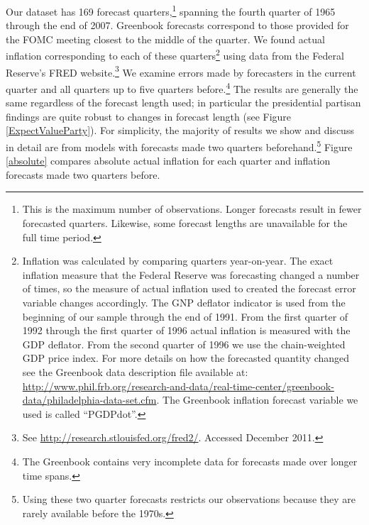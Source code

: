 \documentclass[a4paper]{article}\usepackage{graphicx, color}
\begin{document}
Our dataset has 169 forecast quarters,\footnote{This is the maximum number of observations. Longer forecasts result in fewer forecasted quarters. Likewise, some forecast lengths are unavailable for the full time period.} spanning the fourth quarter of 1965 through the end of 2007. Greenbook forecasts correspond to those provided for the FOMC meeting closest to the middle of the quarter. We found actual inflation corresponding to each of these quarters\footnote{Inflation was calculated by comparing quarters year-on-year. The exact inflation measure that the Federal Reserve was forecasting changed a number of times, so the measure of actual inflation used to created the forecast error variable changes accordingly. The GNP deflator indicator is used from the beginning of our sample through the end of 1991. From the first quarter of 1992 through the first quarter of 1996 actual inflation is measured with the GDP deflator. From the second quarter of 1996 we use the chain-weighted GDP price index. For more details on how the forecasted quantity changed see the Greenbook data description file available at: \url{http://www.phil.frb.org/research-and-data/real-time-center/greenbook-data/philadelphia-data-set.cfm}. The Greenbook inflation forecast variable we used is called ``PGDPdot''.} using data from the Federal Reserve's FRED website.\footnote{See \url{http://research.stlouisfed.org/fred2/}. Accessed December 2011.} We examine errors made by forecasters in the current quarter and all quarters up to five quarters before.\footnote{The Greenbook contains very incomplete data for forecasts made over longer time spans.} The results are generally the same regardless of the forecast length used; in particular the presidential partisan findings are quite robust to changes in forecast length (see Figure \ref{ExpectValueParty}). For simplicity, the majority of results we show and discuss in detail are from models with forecasts made two quarters beforehand.\footnote{Using these two quarter forecasts restricts our observations because they are rarely available before the 1970s.} Figure \ref{absolute} compares absolute actual inflation for each quarter and inflation forecasts made two quarters before.
\end{document}
